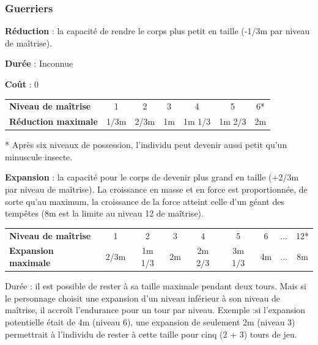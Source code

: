 \documentclass[11pt]{article}
\begin{document}
{%
\subsubsection*{Guerriers}

\textbf{\color{blue}Réduction} : la capacité de rendre le corps plus petit en taille (-1/3m par niveau de maîtrise).

\bigskip

\textbf{Durée} : Inconnue

\textbf{Coût} : 0

\bigskip

{\parindent1cm\begin{tabular}{lcccccc}
\textbf{Niveau de maîtrise} & 1 & 2 & 3 & 4 & 5 & 6* \\
\textbf{Réduction maximale} & 1/3m & 2/3m & 1m & 1m 1/3 & 1m 2/3 & 2m \\
\end{tabular}}

\medskip

* Après six niveaux de possession, l'individu peut devenir aussi petit qu'un minuscule insecte.

\bigskip

\textbf{\color{blue}Expansion} : la capacité pour le corps de devenir plus grand en taille (+2/3m par niveau de maîtrise). La croissance en masse et en force est proportionnée, de sorte qu'au maximum, la croissance de la force atteint celle d'un géant des tempêtes (8m est la limite au niveau 12 de maîtrise).

\bigskip

{\parindent1cm\begin{tabular}{lcccccccc}
\textbf{Niveau de maîtrise} & 1 & 2 & 3 & 4 & 5 & 6 & ... & 12* \\
\textbf{Expansion maximale} & 2/3m & 1m 1/3 & 2m & 2m 2/3 & 3m 1/3 & 4m & ... & 8m \\
\end{tabular}}

\bigskip

Durée : il est possible de rester à sa taille maximale pendant deux tours. Mais si le personnage choisit une expansion d'un niveau inférieur à son niveau de maîtrise, il accroît l'endurance pour un tour par niveau. Exemple :si l'expansion potentielle était de 4m (niveau 6), une expansion de seulement 2m (niveau 3) permettrait à l'individu de rester à cette taille pour cinq (2 + 3) tours de jeu.

}
\end{document}
